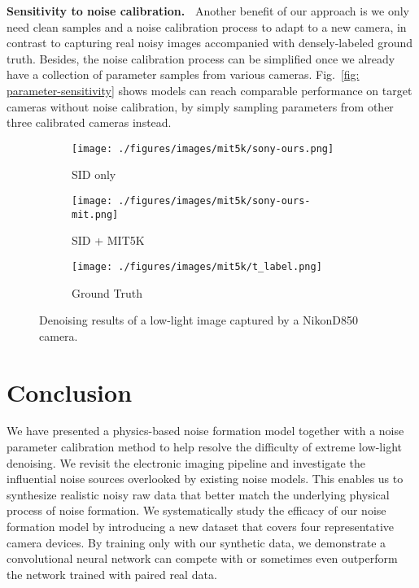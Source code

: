 \documentclass[10pt,twocolumn,letterpaper]{article}
\begin{document}
\vspace{3pt}
\noindent\textbf{Sensitivity to noise calibration.~}
Another benefit of our approach is we only need clean samples and a noise calibration process to adapt to a new camera, in contrast to capturing real noisy images accompanied with densely-labeled ground truth. 
Besides, the noise calibration process can be simplified once we already have a collection of parameter samples from various cameras. Fig.~\ref{fig: parameter-sensitivity} shows models can reach comparable performance on target cameras without noise calibration, by simply sampling parameters from other three calibrated cameras instead. 

\begin{figure}[!t]
\centering
\begin{subfigure}[b]{.32\linewidth}
\centering
\texttt{[image: ./figures/images/mit5k/sony-ours.png]}
\caption{SID only}
\end{subfigure}
\begin{subfigure}[b]{.32\linewidth}
\centering
\texttt{[image: ./figures/images/mit5k/sony-ours-mit.png]}
\caption{SID + MIT5K}
\end{subfigure}
\begin{subfigure}[b]{.32\linewidth}
\centering
\texttt{[image: ./figures/images/mit5k/t\_label.png]}
\caption{Ground Truth}
\end{subfigure}
\caption{Denoising results of a low-light image captured by a NikonD850 camera. }
\label{fig:mit5k-vis}
\end{figure}






\section{Conclusion} \label{sec:conclusion}
We have presented a physics-based noise formation model together with a noise parameter calibration method to help resolve the difficulty of extreme low-light denoising.  
We revisit the electronic imaging pipeline and investigate the influential noise sources overlooked by existing noise models.  
This enables us to synthesize realistic noisy raw data that better match the underlying physical process of noise formation. 
We systematically study the efficacy of our noise formation model by introducing a new dataset that covers four representative camera devices. 
By training only with our synthetic data, we demonstrate a convolutional neural network can compete with or sometimes even outperform the network trained with paired real data.
\end{document}
